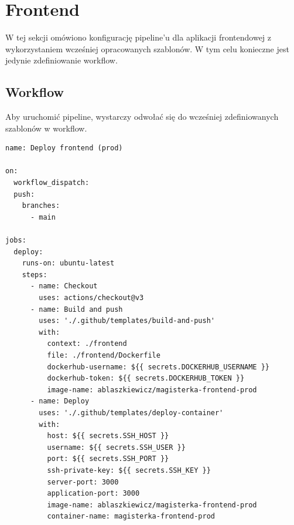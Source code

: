 \documentclass{article}
\begin{document}
\section{Frontend}

W tej sekcji omówiono konfigurację pipeline’u dla aplikacji frontendowej z wykorzystaniem wcześniej opracowanych szablonów. W tym celu konieczne jest jedynie zdefiniowanie workflow.

\subsection{Workflow}

Aby uruchomić pipeline, wystarczy odwołać się do wcześniej zdefiniowanych szablonów w workflow.

\begin{lstlisting}[caption=Plik \texttt{.github/workflows/prod-deploy-frontend.yml}]
name: Deploy frontend (prod)

on:
  workflow_dispatch:
  push:
    branches:
      - main

jobs:
  deploy:
    runs-on: ubuntu-latest
    steps:
      - name: Checkout
        uses: actions/checkout@v3
      - name: Build and push
        uses: './.github/templates/build-and-push'
        with:
          context: ./frontend
          file: ./frontend/Dockerfile
          dockerhub-username: ${{ secrets.DOCKERHUB_USERNAME }}
          dockerhub-token: ${{ secrets.DOCKERHUB_TOKEN }}
          image-name: ablaszkiewicz/magisterka-frontend-prod
      - name: Deploy
        uses: './.github/templates/deploy-container'
        with:
          host: ${{ secrets.SSH_HOST }}
          username: ${{ secrets.SSH_USER }}
          port: ${{ secrets.SSH_PORT }}
          ssh-private-key: ${{ secrets.SSH_KEY }}
          server-port: 3000
          application-port: 3000
          image-name: ablaszkiewicz/magisterka-frontend-prod
          container-name: magisterka-frontend-prod

\end{lstlisting}
\end{document}
